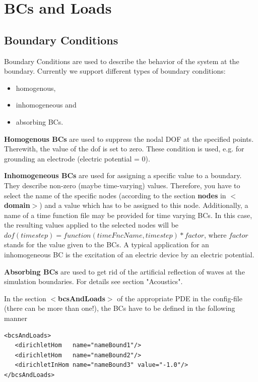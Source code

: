 \chapter{BCs and Loads}
\section{Boundary Conditions}
Boundary Conditions are used to describe the behavior of the system at
the boundary. Currently we support different types of boundary
conditions: 

\begin{itemize}
\item homogenous,
\item inhomogeneous and
\item absorbing BCs.
\end{itemize}

{\bf Homogenous BCs} are used to suppress the nodal DOF at the specified
points. Therewith, the value of the dof is set to zero. These
condition is used, e.g. for grounding an electrode (electric potential
= 0).

{\bf Inhomogeneous BCs}  are used for assigning a
  specific value to a boundary. They describe non-zero (maybe
  time-varying) values.  Therefore, you have to select the name of the
  specific nodes (according to the section {\bf nodes} in {\bf
    $<$domain$>$}) and a value which has to be assigned to this node.
  Additionally, a name of a time function file may be provided for
  time varying BCs. In this case, the resulting values applied to the
  selected nodes will be ${dof}(timestep) =
  function(timeFncName,timestep)*factor$, where $factor$ stands for
  the value given to the BCs. A typical application for an
  inhomogeneous BC is the excitation of an electric device by an
  electric potential.

{\bf Absorbing BCs} are used to get rid of the
  artificial reflection of waves at the simulation boundaries. For
  details see section "Acoustics".

\bigskip

In the section {\bf $<$bcsAndLoads$>$} of the appropriate PDE in the
config-file (there can be more than one!), the BCs have to be defined
in the following manner
\begin{verbatim}
<bcsAndLoads>
   <dirichletHom   name="nameBound1"/>
   <dirichletHom   name="nameBound2"/>
   <dirichletInHom name="nameBound3" value="-1.0"/>
</bcsAndLoads>
\end{verbatim}

